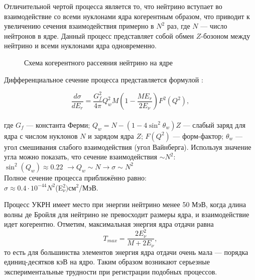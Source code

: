 Отличительной чертой процесса является то, что нейтрино вступает во взаимодействие со всеми нуклонами ядра когерентным образом, что приводит к увеличению сечения взаимодействия примерно в $N^2$ раз, где $N$ --- число нейтронов в ядре. Данный процесс представляет собой обмен $Z$-бозоном между нейтрино и всеми нуклонами ядра одновременно.
\begin{figure}[h]
	\caption{Схема когерентного рассеяния нейтрино на ядре}
	\label{ris:cevns}
\end{figure}
\par Дифференциальное сечение процесса представляется формулой \cite{cevns1, Lindner2017}:
	
\begin{equation}
\frac{d\sigma}{dE_r} = \frac{G_f^2}{4\pi} Q_w^2M\left(1-\frac{ME_r}{2E_\nu}\right)F^2(Q^2),
\end{equation}\\
	
	где $G_f$ --- константа Ферми;
	$Q_w=N-(1-4\sin^{2}\theta_w)Z$ --- слабый заряд для ядра с числом нуклонов $N$ и зарядом ядра $Z$;
	$F(Q^2)$ --- форм-фактор;
	$\theta_w$ --- угол смешивания слабого взаимодействия (угол Вайнберга).
	Используя значение угла можно показать, что сечение взаимодействия
	 $\sim N^2$:\\
	 
	$\sin^2(Q_w)\approx 0.22$ $\to Q_w\sim N \to \sigma \sim N^2$\\
	
	Полное сечение процесса приближённо равно:\\
	
	$\sigma \approx 0.4\cdot10^{-44}  N^2$(E$_\nu^2)$см$^{2}$/МэВ. \\
	\par
	Процесс УКРН имеет место при энергии нейтрино менее 50 МэВ, когда длина волны де Бройля для нейтрино не превосходит размеры ядра, и взаимодействие идет когерентно.
	Отметим, максимальная энергия ядра отдачи равна
\begin{equation}
    T_{max} = \frac{2E_{\nu}^{2}}{M+2E_{\nu}},
    \label{Tmax}
\end{equation}
то есть для большинства элементов энергия ядра отдачи очень мала --- порядка единиц-десятков кэВ на ядро. Таким образом возникают серьезные экспериментальные трудности при регистрации подобных процессов.


